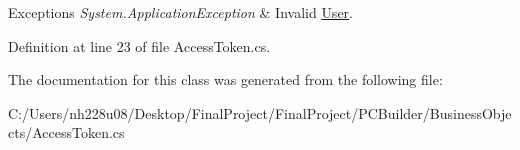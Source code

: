\begin{DoxyExceptions}{Exceptions}
{\em System.\+Application\+Exception} & Invalid \hyperlink{class_business_objects_1_1_user}{User}.\\
\hline
\end{DoxyExceptions}


Definition at line 23 of file Access\+Token.\+cs.



The documentation for this class was generated from the following file\+:\begin{DoxyCompactItemize}
\item 
C\+:/\+Users/nh228u08/\+Desktop/\+Final\+Project/\+Final\+Project/\+P\+C\+Builder/\+Business\+Objects/Access\+Token.\+cs\end{DoxyCompactItemize}
